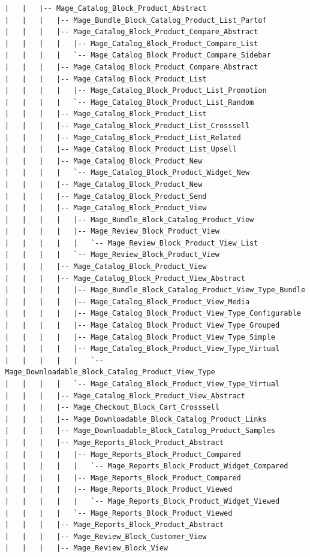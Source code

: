 \documentclass[oneside]{book}
\begin{document}
\begin{lstlisting}
|   |   |-- Mage_Catalog_Block_Product_Abstract
|   |   |   |-- Mage_Bundle_Block_Catalog_Product_List_Partof
|   |   |   |-- Mage_Catalog_Block_Product_Compare_Abstract
|   |   |   |   |-- Mage_Catalog_Block_Product_Compare_List
|   |   |   |   `-- Mage_Catalog_Block_Product_Compare_Sidebar
|   |   |   |-- Mage_Catalog_Block_Product_Compare_Abstract
|   |   |   |-- Mage_Catalog_Block_Product_List
|   |   |   |   |-- Mage_Catalog_Block_Product_List_Promotion
|   |   |   |   `-- Mage_Catalog_Block_Product_List_Random
|   |   |   |-- Mage_Catalog_Block_Product_List
|   |   |   |-- Mage_Catalog_Block_Product_List_Crosssell
|   |   |   |-- Mage_Catalog_Block_Product_List_Related
|   |   |   |-- Mage_Catalog_Block_Product_List_Upsell
|   |   |   |-- Mage_Catalog_Block_Product_New
|   |   |   |   `-- Mage_Catalog_Block_Product_Widget_New
|   |   |   |-- Mage_Catalog_Block_Product_New
|   |   |   |-- Mage_Catalog_Block_Product_Send
|   |   |   |-- Mage_Catalog_Block_Product_View
|   |   |   |   |-- Mage_Bundle_Block_Catalog_Product_View
|   |   |   |   |-- Mage_Review_Block_Product_View
|   |   |   |   |   `-- Mage_Review_Block_Product_View_List
|   |   |   |   `-- Mage_Review_Block_Product_View
|   |   |   |-- Mage_Catalog_Block_Product_View
|   |   |   |-- Mage_Catalog_Block_Product_View_Abstract
|   |   |   |   |-- Mage_Bundle_Block_Catalog_Product_View_Type_Bundle
|   |   |   |   |-- Mage_Catalog_Block_Product_View_Media
|   |   |   |   |-- Mage_Catalog_Block_Product_View_Type_Configurable
|   |   |   |   |-- Mage_Catalog_Block_Product_View_Type_Grouped
|   |   |   |   |-- Mage_Catalog_Block_Product_View_Type_Simple
|   |   |   |   |-- Mage_Catalog_Block_Product_View_Type_Virtual
|   |   |   |   |   `-- Mage_Downloadable_Block_Catalog_Product_View_Type
|   |   |   |   `-- Mage_Catalog_Block_Product_View_Type_Virtual
|   |   |   |-- Mage_Catalog_Block_Product_View_Abstract
|   |   |   |-- Mage_Checkout_Block_Cart_Crosssell
|   |   |   |-- Mage_Downloadable_Block_Catalog_Product_Links
|   |   |   |-- Mage_Downloadable_Block_Catalog_Product_Samples
|   |   |   |-- Mage_Reports_Block_Product_Abstract
|   |   |   |   |-- Mage_Reports_Block_Product_Compared
|   |   |   |   |   `-- Mage_Reports_Block_Product_Widget_Compared
|   |   |   |   |-- Mage_Reports_Block_Product_Compared
|   |   |   |   |-- Mage_Reports_Block_Product_Viewed
|   |   |   |   |   `-- Mage_Reports_Block_Product_Widget_Viewed
|   |   |   |   `-- Mage_Reports_Block_Product_Viewed
|   |   |   |-- Mage_Reports_Block_Product_Abstract
|   |   |   |-- Mage_Review_Block_Customer_View
|   |   |   |-- Mage_Review_Block_View

\end{lstlisting}
\end{document}
